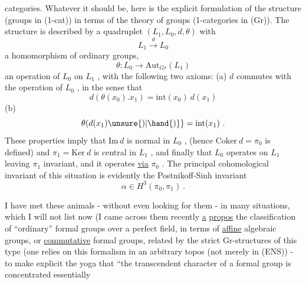 
categories. Whatever it should be, here is the explicit formulation
of the structure (groups in (1-cat)) in terms of the theory of
groups (1-categories in (Gr)). The structure is described by a
quadruplet $(L_1, L_0, d,\theta)$ with
\[ L_1 \xrightarrow{\ d\ } L_0 \]
a homomorphism of ordinary groups,
\[ \theta : L_0 \longrightarrow \mathrm{Aut}_{Gr}(L_1) \]
an operation of $L_0$ on $L_1$ , with the following two axioms:
(a) $d$ commutes with the operation of $L_0$ , in the
sense that
\[ d(\theta(x_0).x_1) = \mathrm{int}(x_0)\ d(x_1) \]
(b) \[ \theta(d(x_1)\unsure{)|\hand{)}} = \mathrm{int}(x_1) \ . \]
These properties imply that $\mathrm{Im}\, d$ is normal in $L_0$ , (hence
$\mathrm{Coker}\ d = \pi_0$ is defined) and $\pi_1 = \mathrm{Ker}\ d$ is central in $L_1$ ,
and finally that $L_0$ operates on $L_1$ leaving $\pi_1$ invariant,
and it operates \uline{via} $\pi_0$ . The principal cohomological invariant
of this situation is evidently the Postnikoff-Sinh invariant
\[ \alpha \in H^3(\pi_0, \pi_1) \ . \]

I have met these animals - without even looking for them -
in many situations, which I will not list now (I came across them
recently \uline{a} \uline{propos} the classification of ``ordinary'' formal groups
over a perfect field, in terms of \uline{affine} algebraic groups, or
\uline{commutative} formal groups, related by the strict Gr-structures of
this type (one relies on this formalism in an arbitrary topos
(not merely in (ENS)) - to make explicit the yoga that ``the
transcendent character of a formal group is concentrated essentially

